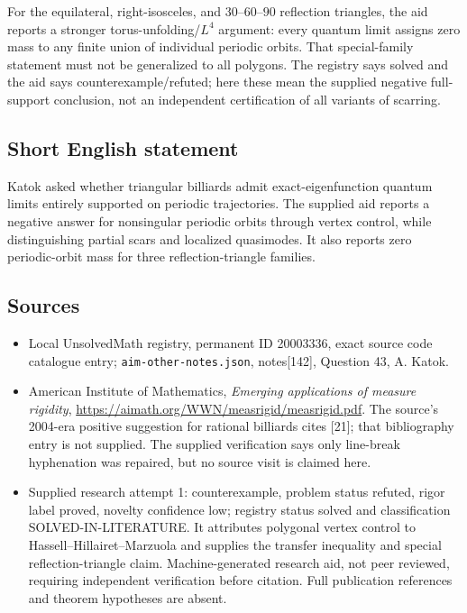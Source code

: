 \documentclass[11pt]{article}
\begin{document}
For the equilateral, right-isosceles, and $30$--$60$--$90$ reflection triangles, the aid reports a stronger torus-unfolding/$L^4$ argument: every quantum limit assigns zero mass to any finite union of individual periodic orbits. That special-family statement must not be generalized to all polygons. The registry says solved and the aid says counterexample/refuted; here these mean the supplied negative full-support conclusion, not an independent certification of all variants of scarring.
\subsection{Short English statement}
Katok asked whether triangular billiards admit exact-eigenfunction quantum limits entirely supported on periodic trajectories. The supplied aid reports a negative answer for nonsingular periodic orbits through vertex control, while distinguishing partial scars and localized quasimodes. It also reports zero periodic-orbit mass for three reflection-triangle families.
\subsection{Sources}
\begin{itemize}
\item Local UnsolvedMath registry, permanent ID 20003336, exact source code catalogue entry; \texttt{aim-other-notes.json}, notes[142], Question 43, A. Katok.
\item American Institute of Mathematics, \emph{Emerging applications of measure rigidity}, \url{https://aimath.org/WWN/measrigid/measrigid.pdf}. The source's 2004-era positive suggestion for rational billiards cites [21]; that bibliography entry is not supplied. The supplied verification says only line-break hyphenation was repaired, but no source visit is claimed here.
\item Supplied research attempt 1: counterexample, problem status refuted, rigor label proved, novelty confidence low; registry status solved and classification SOLVED-IN-LITERATURE. It attributes polygonal vertex control to Hassell--Hillairet--Marzuola and supplies the transfer inequality and special reflection-triangle claim. Machine-generated research aid, not peer reviewed, requiring independent verification before citation. Full publication references and theorem hypotheses are absent.
\end{itemize}
\end{document}
